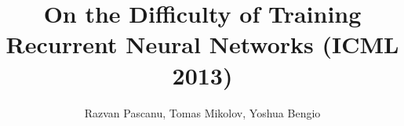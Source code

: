 \documentclass[final]{beamer}
\title{On the Difficulty of Training Recurrent Neural Networks (ICML 2013)}
\author{Razvan Pascanu, Tomas Mikolov, Yoshua Bengio}
\begin{document}
\begin{frame}[t]



\end{frame}
\end{document}
